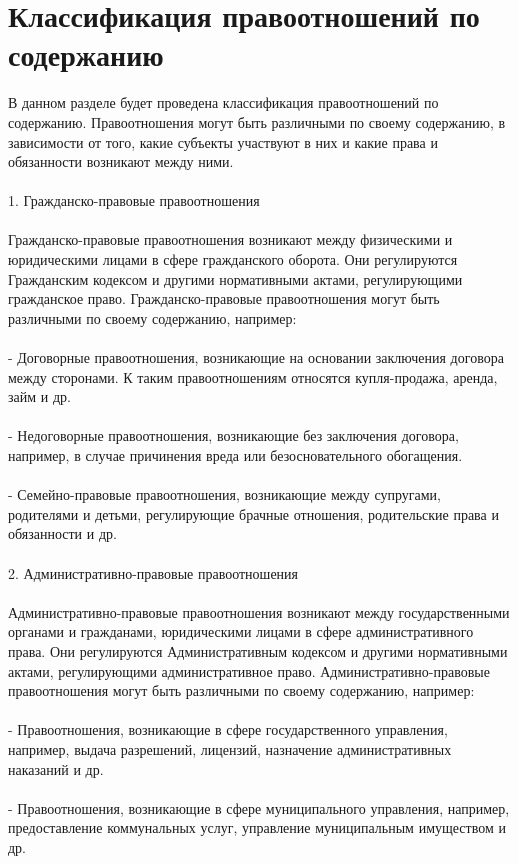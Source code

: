 \documentclass{article}
\begin{document}
\section{Классификация правоотношений по содержанию}
В данном разделе будет проведена классификация правоотношений по содержанию. Правоотношения могут быть различными по своему содержанию, в зависимости от того, какие субъекты участвуют в них и какие права и обязанности возникают между ними.\\
~\\
1. Гражданско-правовые правоотношения\\
~\\
Гражданско-правовые правоотношения возникают между физическими и юридическими лицами в сфере гражданского оборота. Они регулируются Гражданским кодексом и другими нормативными актами, регулирующими гражданское право. Гражданско-правовые правоотношения могут быть различными по своему содержанию, например:\\
~\\
- Договорные правоотношения, возникающие на основании заключения договора между сторонами. К таким правоотношениям относятся купля-продажа, аренда, займ и др.\\
~\\
- Недоговорные правоотношения, возникающие без заключения договора, например, в случае причинения вреда или безосновательного обогащения.\\
~\\
- Семейно-правовые правоотношения, возникающие между супругами, родителями и детьми, регулирующие брачные отношения, родительские права и обязанности и др.\\
~\\
2. Административно-правовые правоотношения\\
~\\
Административно-правовые правоотношения возникают между государственными органами и гражданами, юридическими лицами в сфере административного права. Они регулируются Административным кодексом и другими нормативными актами, регулирующими административное право. Административно-правовые правоотношения могут быть различными по своему содержанию, например:\\
~\\
- Правоотношения, возникающие в сфере государственного управления, например, выдача разрешений, лицензий, назначение административных наказаний и др.\\
~\\
- Правоотношения, возникающие в сфере муниципального управления, например, предоставление коммунальных услуг, управление муниципальным имуществом и др.\\
\end{document}
